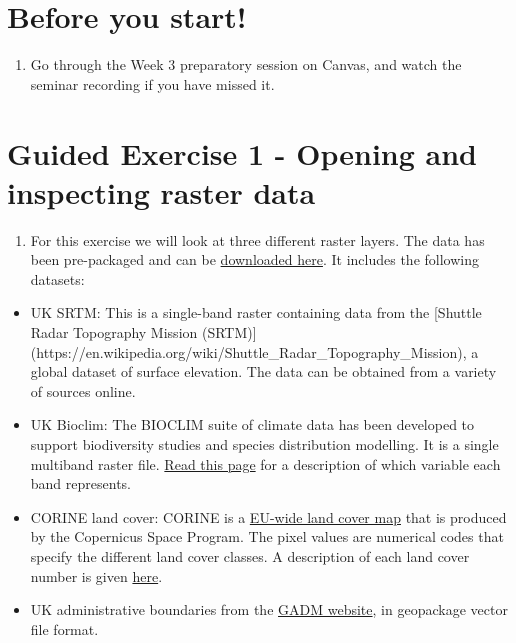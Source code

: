 \documentclass[
  letterpaper,
  DIV=11,
  numbers=noendperiod]{scrreprt}
\providecommand{\tightlist}{%
  \setlength{\itemsep}{0pt}\setlength{\parskip}{0pt}}\usepackage{longtable,booktabs,array}
\begin{document}
\section{Before you start!}\label{before-you-start-3}

\begin{enumerate}
\def\labelenumi{\arabic{enumi}.}
\tightlist
\item
  Go through the Week 3 preparatory session on Canvas, and watch the
  seminar recording if you have missed it.
\end{enumerate}

\section{Guided Exercise 1 - Opening and inspecting raster
data}\label{guided-exercise-1---opening-and-inspecting-raster-data}

\begin{enumerate}
\def\labelenumi{(\arabic{enumi})}
\setcounter{enumi}{116}
\tightlist
\item
  For this exercise we will look at three different raster layers. The
  data has been pre-packaged and can be
  \href{https://stir-my.sharepoint.com/:u:/g/personal/ala2_stir_ac_uk/ESim8eCFo_ZCkZ4DQJ6eKpcBSJQSWHQErdPpkgcktwrXtg?e=5eG27g}{downloaded
  here}. It includes the following datasets:
\end{enumerate}

\begin{itemize}
\item
  UK SRTM: This is a single-band raster containing data from the
  {[}Shuttle Radar Topography Mission (SRTM){]}
  (https://en.wikipedia.org/wiki/Shuttle\_Radar\_Topography\_Mission), a
  global dataset of surface elevation. The data can be obtained from a
  variety of sources online.
\item
  UK Bioclim: The BIOCLIM suite of climate data has been developed to
  support biodiversity studies and species distribution modelling. It is
  a single multiband raster file.
  \href{https://www.worldclim.org/data/bioclim.html}{Read this page} for
  a description of which variable each band represents.
\item
  CORINE land cover: CORINE is a
  \href{https://land.copernicus.eu/en/products/corine-land-cover}{EU-wide
  land cover map} that is produced by the Copernicus Space Program. The
  pixel values are numerical codes that specify the different land cover
  classes. A description of each land cover number is given
  \href{https://land.copernicus.eu/content/corine-land-cover-nomenclature-guidelines/html/}{here}.
\item
  UK administrative boundaries from the \href{https://gadm.org/}{GADM
  website}, in geopackage vector file format.
\end{itemize}
\end{document}
